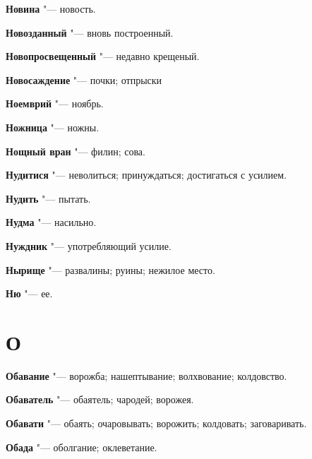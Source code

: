 \begin{mymulticols}{2}
\noindent\textbf{Новина} "--- новость. 




\noindent\textbf{Новозданный} "--- вновь построенный. 




\noindent\textbf{Новопросвещенный} "--- недавно крещеный. 




\noindent\textbf{Новосаждение} "--- почки; отпрыски 




\noindent\textbf{Ноемврий} "--- ноябрь. 




\noindent\textbf{Ножница} "--- ножны. 




\noindent\textbf{Нощный вран} "--- филин; сова. 




\noindent\textbf{Нудитися} "--- неволиться; принуждаться; достигаться с усилием. 




\noindent\textbf{Нудить} "--- пытать. 




\noindent\textbf{Нудма} "--- насильно. 




\noindent\textbf{Нуждник} "--- употребляющий усилие. 




\noindent\textbf{Нырище} "--- развалины; руины; нежилое место. 




\noindent\textbf{Ню} "--- ее. 




\section{О}





\noindent\textbf{Обавание} "--- ворожба; нашептывание; волхвование; колдовство. 




\noindent\textbf{Обаватель} "--- обаятель; чародей; ворожея. 




\noindent\textbf{Обавати} "--- обаять; очаровывать; ворожить; колдовать; заговаривать. 




\noindent\textbf{Обада} "--- оболгание; оклеветание. 





\end{mymulticols}
